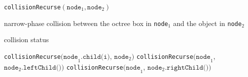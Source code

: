 \begin{algorithm}[htb]
	\caption{\texttt{collisionRecurse}$(\texttt{node}_1, \texttt{node}_2)$}
	\label{algo:collision_recurse}
	\begin{algorithmic}[1]
                \STATE narrow-phase collision between the octree box in \texttt{node}$_1$ and the object in \texttt{node}$_2$
           \ENDIF

           \RETURN collision status
      \ENDIF

                   \STATE  \texttt{collisionRecurse}$\texttt{(node}_1.\texttt{child(i)}$, $\texttt{node}_2\texttt{)}$
                \ENDIF
              \ENDFOR
            \ELSE
              \STATE \texttt{collisionRecurse}$\texttt{(node}_1$, $\texttt{node}_2.\texttt{leftChild())}$
              \STATE \texttt{collisionRecurse}$\texttt{(node}_1$, $\texttt{node}_2.\texttt{rightChild())}$

            \ENDIF
\end{algorithmic}
\end{algorithm}




